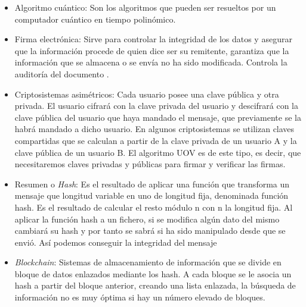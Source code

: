 \begin{itemize}
	\item Algoritmo cuántico: Son los algoritmos que pueden ser resueltos por un computador cuántico en tiempo polinómico.



 	\item Firma electrónica: Sirve para controlar la integridad de los datos y asegurar que la información procede de quien dice ser su remitente, garantiza que la información que se almacena o se envía no ha sido modificada. Controla la auditoría del documento \cite{firmaDigital}. 


	\item Criptosistemas asimétricos: Cada usuario posee una clave pública y otra privada. El usuario cifrará con la clave privada del usuario y descifrará con la clave pública del usuario que haya mandado el mensaje, que previamente se la habrá mandado a dicho usuario. En algunos criptosistemas se utilizan claves compartidas que se calculan a partir de la clave privada de un usuario A y la clave pública de un usuario B. El algoritmo UOV es de este tipo, es decir, que necesitaremos claves privadas y públicas para firmar y verificar las firmas.


	\item Resumen o \textit{Hash}: Es el resultado de aplicar una función que transforma un mensaje que longitud variable en uno de longitud fija, denominada función hash. Es el resultado de calcular el resto módulo n con n la longitud fija. Al aplicar la función hash a un fichero, si se modifica algún dato del mismo cambiará su hash y por tanto se sabrá si ha sido manipulado desde que se envió. Así podemos conseguir la integridad del mensaje


	\item \textit{Blockchain}: Sistemas de almacenamiento de información que se divide en bloque de datos enlazados mediante los hash. A cada bloque se le asocia un hash a partir del bloque anterior, creando una lista enlazada, la búsqueda de información no es muy óptima si hay un número elevado de bloques. %
	

\end{itemize}
